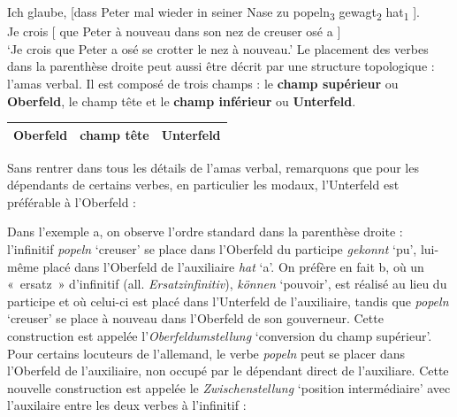 {    \ea
    \gll  Ich glaube,   [dass Peter mal wieder in seiner Nase zu popeln\textsubscript{3} gewagt\textsubscript{2} hat\textsubscript{1}   ].\\
    Je crois   [ que  Peter à nouveau dans son nez   de creuser  osé        a   ]\\
    ‘Je crois que Peter a osé se crotter le nez à nouveau.’
    \z
    Le placement des verbes dans la parenthèse droite peut aussi être décrit par une structure topologique : l’amas verbal. Il est composé de trois champs : le \textbf{champ supérieur} ou \textbf{Oberfeld}, le champ tête et le \textbf{champ inférieur} ou \textbf{Unterfeld}.

    \begin{center}
    \def\arraystretch{1.5}
    \setlength{\tabcolsep}{4ex}
    \begin{tabular}{|c|c|c|}
    \hline
    Oberfeld & champ tête & Unterfeld\\
    \hline
    \end{tabular}
    \end{center}
    
    Sans rentrer dans tous les détails de l’amas verbal, remarquons que pour les dépendants de certains verbes, en particulier les modaux, l’Unterfeld est préférable à l’Oberfeld :

    \ea\label{ex:popel}
    \z
    \z

    Dans l’exemple a, on observe l’ordre standard dans la parenthèse droite : l’infinitif \textit{popeln} ‘creuser’ se place dans l’Oberfeld du participe \textit{gekonnt} ‘pu’, lui-même placé dans l’Oberfeld de l’auxiliaire \textit{hat} ‘a’. On préfère en fait b, où un «~ersatz~» d’infinitif (all. \textit{Ersatzinfinitiv}), \textit{können} ‘pouvoir’, est réalisé au lieu du participe et où celui-ci est placé dans l’Unterfeld de l’auxiliaire, tandis que \textit{popeln} ‘creuser’ se place à nouveau dans l’Oberfeld de son gouverneur. Cette construction est appelée l’\textit{Oberfeldumstellung} ‘conversion du champ supérieur’. Pour certains locuteurs de l’allemand, le verbe \textit{popeln} peut se placer dans l’Oberfeld de l’auxiliaire, non occupé par le dépendant direct de l’auxiliare. Cette nouvelle construction est appelée le \textit{Zwischenstellung} ‘position intermédiaire’ avec l’auxilaire entre les deux verbes à l’infinitif :

}
